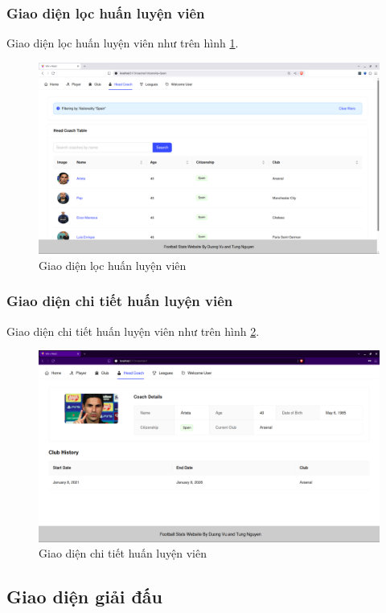 \documentclass[../BTL.tex]{subfiles}
\begin{document}
\subsubsection{Giao diện lọc huấn luyện viên}
Giao diện lọc huấn luyện viên như trên hình \ref{fig:user-coach-filter}.
\begin{figure}
\centering
\includegraphics[width=1\linewidth]{Hinhve/user-coach-filter.png}
\caption{Giao diện lọc huấn luyện viên}
\label{fig:user-coach-filter}
\end{figure}

\subsubsection{Giao diện chi tiết huấn luyện viên}
Giao diện chi tiết huấn luyện viên như trên hình \ref{fig:user-coach-detail}.
\begin{figure}
\centering
\includegraphics[width=1\linewidth]{Hinhve/user-coach-detail.png}
\caption{Giao diện chi tiết huấn luyện viên}
\label{fig:user-coach-detail}
\end{figure}
\subsection{ Giao diện giải đấu}
\end{document}
